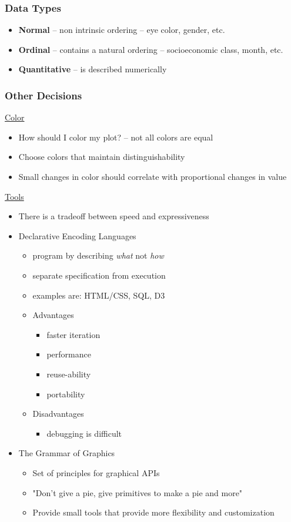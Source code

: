 \subsubsection{Data Types}
\begin{itemize}
    \item \textbf{Normal} -- non intrinsic ordering -- eye color, gender, etc.
    \item \textbf{Ordinal} -- contains a natural ordering -- socioeconomic class, month, etc.
    \item \textbf{Quantitative} -- is described numerically
\end{itemize}

\subsubsection{Other Decisions}
\underline{Color}
\begin{itemize}
    \item How should I color my plot? -- not all colors are equal
    \item Choose colors that maintain distinguishability
    \item Small changes in color should correlate with proportional changes in value
\end{itemize}
\underline{Tools}
\begin{itemize}
    \item There is a tradeoff between speed and expressiveness
    \item Declarative Encoding Languages
    \begin{itemize}
        \item program by describing \textit{what} not \textit{how}
        \item separate specification from execution
        \item examples are: HTML/CSS, SQL, D3
        \item Advantages
        \begin{itemize}
            \item faster iteration
            \item performance
            \item reuse-ability 
            \item portability
        \end{itemize}
        \item Disadvantages
        \begin{itemize}
            \item debugging is difficult
        \end{itemize}
    \end{itemize}
    \item The Grammar of Graphics
    \begin{itemize}
        \item Set of principles for graphical APIs
        \item "Don't give a pie, give primitives to make a pie and more"
        \item Provide small tools that provide more flexibility and customization
    \end{itemize}
\end{itemize}

